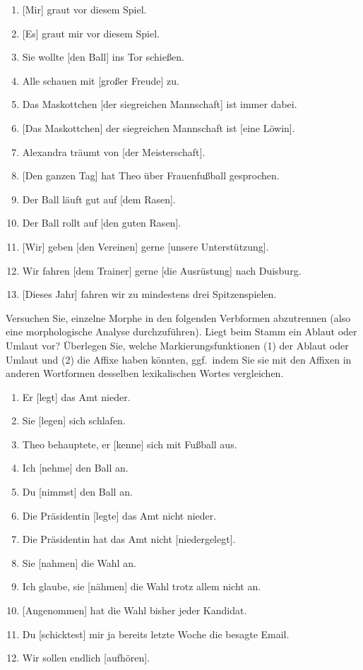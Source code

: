 \begin{enumerate}
  \item {[Mir]} graut vor diesem Spiel.
  \item {[Es]} graut mir vor diesem Spiel.
  \item Sie wollte {[den Ball]} ins Tor schießen.
  \item Alle schauen mit {[großer Freude]} zu.
  \item Das Maskottchen {[der siegreichen Mannschaft]} ist immer dabei.
  \item {[Das Maskottchen]} der siegreichen Mannschaft ist {[eine Löwin]}.
  \item Alexandra träumt von {[der Meisterschaft]}.
  \item {[Den ganzen Tag]} hat Theo über Frauenfußball gesprochen.
  \item Der Ball läuft gut auf {[dem Rasen]}.
  \item Der Ball rollt auf {[den guten Rasen]}.
  \item {[Wir]} geben {[den Vereinen]} gerne {[unsere Unterstützung]}.
  \item Wir fahren {[dem Trainer]} gerne {[die Ausrüstung]} nach Duisburg.
  \item {[Dieses Jahr]} fahren wir zu mindestens drei Spitzenspielen.
\end{enumerate}

\Uebung[\tristar]{} \label{exc:morphologie02} Versuchen Sie, einzelne Morphe in den folgenden Verbformen abzutrennen (also eine morphologische Analyse durchzuführen).
Liegt beim Stamm ein Ablaut oder Umlaut vor?
Überlegen Sie, welche Markierungsfunktionen (1) der Ablaut oder Umlaut und (2) die Affixe haben könnten, ggf.\ indem Sie sie mit den Affixen in anderen Wortformen desselben lexikalischen Wortes vergleichen.

\begin{enumerate}
  \item Er {[legt]} das Amt nieder.
  \item Sie {[legen]} sich schlafen.
  \item Theo behauptete, er {[kenne]} sich mit Fußball aus.
  \item Ich {[nehme]} den Ball an.
  \item Du {[nimmst]} den Ball an.
  \item Die Präsidentin {[legte]} das Amt nicht nieder.
  \item Die Präsidentin hat das Amt nicht {[niedergelegt]}.
  \item Sie {[nahmen]} die Wahl an.
  \item Ich glaube, sie {[nähmen]} die Wahl trotz allem nicht an.
  \item {[Angenommen]} hat die Wahl bisher jeder Kandidat.
  \item Du {[schicktest]} mir ja bereits letzte Woche die besagte Email.
  \item Wir sollen endlich {[aufhören]}.
\end{enumerate}

